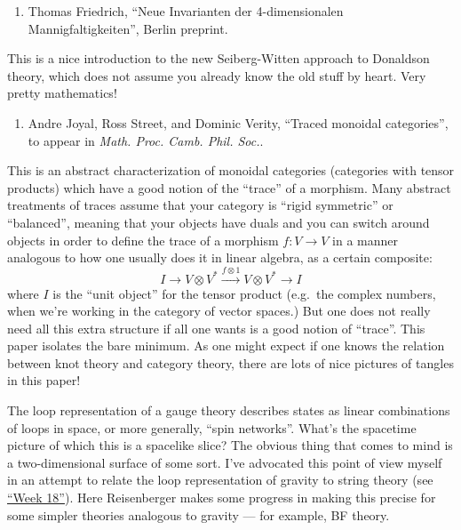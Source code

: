 \documentclass{article}
\def\tightlist{}
\renewcommand{\texttt}[1]{%
  \begingroup
  \ttfamily
  \begingroup\lccode`~=`/\lowercase{\endgroup\def~}{/\discretionary{}{}{}}%
  \begingroup\lccode`~=`[\lowercase{\endgroup\def~}{[\discretionary{}{}{}}%
  \begingroup\lccode`~=`.\lowercase{\endgroup\def~}{.\discretionary{}{}{}}%
  \catcode`/=\active\catcode`[=\active\catcode`.=\active
  \scantokens{#1\noexpand}%
  \endgroup
}
\begin{document}
\begin{enumerate}
\def\labelenumi{\arabic{enumi})}
\setcounter{enumi}{2}
\tightlist
\item
  Thomas Friedrich, ``Neue Invarianten der 4-dimensionalen
  Mannigfaltigkeiten'', Berlin preprint.
\end{enumerate}

This is a nice introduction to the new Seiberg-Witten approach to
Donaldson theory, which does not assume you already know the old stuff
by heart. Very pretty mathematics!

\begin{enumerate}
\def\labelenumi{\arabic{enumi})}
\setcounter{enumi}{3}
\tightlist
\item
  Andre Joyal, Ross Street, and Dominic Verity, ``Traced monoidal
  categories'', to appear in \emph{Math. Proc. Camb. Phil. Soc.}.
\end{enumerate}

This is an abstract characterization of monoidal categories (categories
with tensor products) which have a good notion of the ``trace'' of a
morphism. Many abstract treatments of traces assume that your category
is ``rigid symmetric'' or ``balanced'', meaning that your objects have
duals and you can switch around objects in order to define the trace of
a morphism \(f\colon V \to V\) in a manner analogous to how one usually
does it in linear algebra, as a certain composite:
\[I\to V\otimes V^* \xrightarrow{f\otimes1}V\otimes V^*\to I\] where
\(I\) is the ``unit object'' for the tensor product (e.g.~the complex
numbers, when we're working in the category of vector spaces.) But one
does not really need all this extra structure if all one wants is a good
notion of ``trace''. This paper isolates the bare minimum. As one might
expect if one knows the relation between knot theory and category
theory, there are lots of nice pictures of tangles in this paper!


The loop representation of a gauge theory describes states as linear
combinations of loops in space, or more generally, ``spin networks''.
What's the spacetime picture of which this is a spacelike slice? The
obvious thing that comes to mind is a two-dimensional surface of some
sort. I've advocated this point of view myself in an attempt to relate
the loop representation of gravity to string theory (see
\protect\hyperlink{week18}{``Week 18''}). Here Reisenberger makes some
progress in making this precise for some simpler theories analogous to
gravity --- for example, BF theory.
\end{document}
